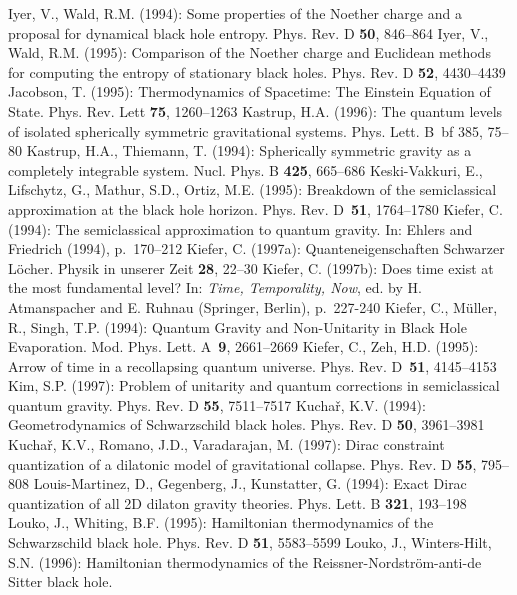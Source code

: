 \begin{thebibliography}
%
\bibitem{}{}{}
Iyer, V., Wald, R.M. (1994): Some properties of the Noether charge
and a proposal for dynamical black hole entropy.
Phys. Rev. D {\bf 50}, 846--864
%
\bibitem{}{}{}
Iyer, V., Wald, R.M. (1995): Comparison of the Noether charge
and Euclidean methods for computing the entropy of stationary
black holes. Phys. Rev. D {\bf 52}, 4430--4439
% 
\bibitem{}{}{}
Jacobson, T. (1995): Thermodynamics of Spacetime: The Einstein
Equation of State. Phys. Rev. Lett {\bf 75}, 1260--1263
%
\bibitem{}{}{}
Kastrup, H.A. (1996): The quantum levels of isolated
spherically symmetric gravitational systems. Phys. Lett. B~{bf 385},
75--80
%
\bibitem{}{}{}
Kastrup, H.A., Thiemann, T. (1994): Spherically symmetric gravity
as a completely integrable system. Nucl. Phys. B {\bf 425}, 665--686
%
\bibitem{}{}{}
Keski-Vakkuri, E., Lifschytz, G., Mathur, S.D., Ortiz, M.E. (1995):
Breakdown of the semiclassical approximation at the black hole
horizon. Phys. Rev. D~{\bf 51}, 1764--1780
%
\bibitem{}{}{}
Kiefer, C. (1994): The semiclassical approximation to quantum gravity.
In: Ehlers and Friedrich (1994), p.~170--212
%
\bibitem{}{}{}
Kiefer, C. (1997a): Quanteneigenschaften Schwarzer L\"ocher.
Physik in unserer Zeit {\bf 28}, 22--30
%
\bibitem{}{}{}
Kiefer, C. (1997b): Does time exist at the most fundamental level?
In: {\it Time, Temporality, Now}, ed. by H. Atmanspacher
and E. Ruhnau (Springer, Berlin), p.~227-240
%
\bibitem{}{}{}
Kiefer, C., M\"uller, R., Singh, T.P. (1994): Quantum Gravity and
Non-Unitarity in Black Hole Evaporation. Mod. Phys. Lett. A~{\bf 9},
2661--2669
%
\bibitem{}{}{}
Kiefer, C., Zeh, H.D. (1995): Arrow of time in a recollapsing
quantum universe. Phys. Rev. D~{\bf 51}, 4145--4153
%
\bibitem{}{}{}
Kim, S.P. (1997): Problem of unitarity and quantum corrections in
semiclassical quantum gravity. Phys. Rev. D {\bf 55}, 7511--7517
%
\bibitem{}{}{}
Kucha\v{r}, K.V. (1994): Geometrodynamics of Schwarzschild
black holes. Phys. Rev. D {\bf 50}, 3961--3981
%
\bibitem{}{}{}
Kucha\v{r}, K.V., Romano, J.D., Varadarajan, M. (1997):
Dirac constraint quantization of a dilatonic model of
gravitational collapse. Phys. Rev. D {\bf 55}, 795--808
%
\bibitem{}{}{}
Louis-Martinez, D., Gegenberg, J., Kunstatter, G. (1994):
Exact Dirac quantization of all 2D dilaton gravity theories.
Phys. Lett. B {\bf 321}, 193--198
%
\bibitem{}{}{}
Louko, J., Whiting, B.F. (1995): Hamiltonian thermodynamics of the
Schwarzschild black hole. Phys. Rev. D {\bf 51}, 5583--5599
%
\bibitem{}{}{}
Louko, J., Winters-Hilt, S.N. (1996): Hamiltonian thermodynamics
of the Reissner-Nordstr\"om-anti-de Sitter black hole.

\end{thebibliography}
